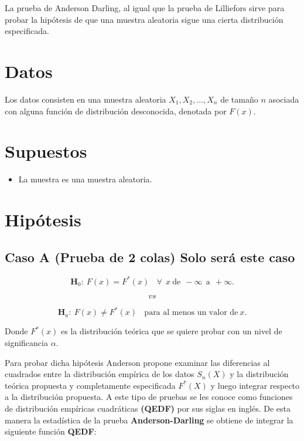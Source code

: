 \documentclass[
  a4paper,
  oneside,
  openany]{book}
\providecommand{\tightlist}{%
  \setlength{\itemsep}{0pt}\setlength{\parskip}{0pt}}
\begin{document}
La prueba de Anderson Darling, al igual que la prueba de Lilliefors sirve para probar la hipótesis de que una muestra aleatoria sigue una cierta distribución especificada.

\hypertarget{datos-18}{%
\section{Datos}\label{datos-18}}

Los datos consisten en una muestra aleatoria \(X_{1},X_{2},\ldots,X_{n}\) de tamaño \(n\) asociada con alguna función de distribución desconocida, denotada por \(F(x)\).

\hypertarget{supuestos-16}{%
\section{Supuestos}\label{supuestos-16}}

\begin{itemize}
\tightlist
\item
  La muestra es una muestra aleatoria.
\end{itemize}

\hypertarget{hipuxf3tesis-17}{%
\section{Hipótesis}\label{hipuxf3tesis-17}}

\hypertarget{caso-a-prueba-de-2-colas-solo-seruxe1-este-caso}{%
\subsection*{Caso A (Prueba de 2 colas) Solo será este caso}\label{caso-a-prueba-de-2-colas-solo-seruxe1-este-caso}}


\[\textbf{H}_0: \ F(x)=F^*(x) \ \ \ \ \forall\ \ x\  \mbox{de} \ \ -\infty \ \ \mbox{a} \ \  +\infty.\]

\[vs\]

\[\textbf{H}_a: \ F(x) \neq F^*(x) \ \ \ \ \mbox{para al menos un  valor de} \  x.\]

Donde \(F^*(x)\) es la distribución teórica que se quiere probar con un nivel de significancia \(\alpha\).

Para probar dicha hipótesis Anderson propone examinar las diferencias al cuadrados entre la distribución empírica de los datos \(S_{n}(X)\) y la distribución teórica propuesta y completamente especificada \(F^*(X)\) y luego integrar respecto a la distribución propuesta.
A este tipo de pruebas se les conoce como funciones de distribución empíricas cuadráticas \textbf{(QEDF)} por sus siglas en inglés.
De esta manera la estadística de la prueba \textbf{Anderson-Darling} se obtiene de integrar la siguiente función \textbf{QEDF}:
\end{document}
